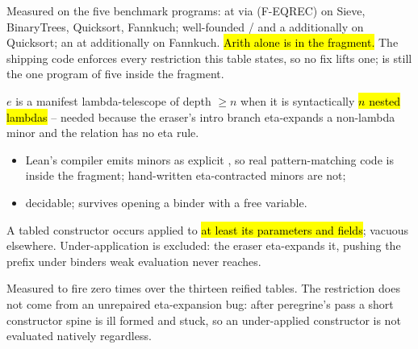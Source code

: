 \begin{remark}
 Measured on the five benchmark programs:  at  via
 (F-EQREC) on Sieve, BinaryTrees, Quicksort, Fannkuch; well-founded
/ and a  additionally on Quicksort; an
 at  additionally on Fannkuch. \hl{Arith alone is
in the fragment.} The shipping code enforces every restriction this table states, so no fix lifts
one;  is still the one program of five inside the fragment.
\end{remark}

\begin{definition}
\label{def:IsLamTelescope}
\leanok
{} $e$ is a manifest lambda-telescope of depth $\ge n$ when it is syntactically
\hl{$n$ nested lambdas} -- needed because the eraser's intro branch eta-expands a non-lambda minor
and the relation has no eta rule.
\begin{itemize}
\item Lean's  compiler emits minors as explicit , so real
pattern-matching code is inside the fragment; hand-written eta-contracted minors are not;
\item decidable; survives opening a binder with a free variable.
\end{itemize}
\end{definition}

\begin{definition}
\label{def:CtorSaturated}
\leanok
{}
 A tabled constructor occurs applied to \hl{at least its parameters and fields};
vacuous elsewhere. Under-application is excluded: the eraser eta-expands it, pushing the prefix
under binders weak evaluation never reaches.
\end{definition}

\begin{remark}
 Measured to fire zero times over the thirteen reified tables. The restriction does
not come from an unrepaired eta-expansion bug: after peregrine's 
pass a short constructor spine is ill formed and stuck, so an under-applied constructor is not
evaluated natively regardless.
\end{remark}

